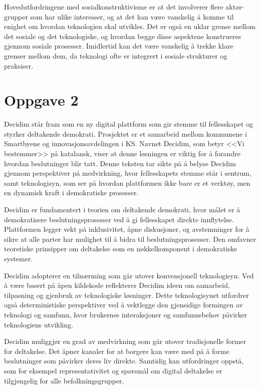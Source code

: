 \documentclass[a4paper, 12pt]{article}  %
\begin{document}
Hovedutfordringene med sosialkonstruktivisme er at det involverer flere aktør-grupper som har ulike interesser, og at det kan være vanskelig å komme til enighet om hvordan teknologien skal utvikles. 
Det er også en uklar grense mellom det sosiale og det teknologiske, og hvordan begge disse aspektene konstrueres gjennom sosiale prosesser.
Imidlertid kan det være vanskelig å trekke klare grenser mellom dem, da teknologi ofte er integrert i sosiale strukturer og praksiser.


\section*{Oppgave 2}

Decidim står fram som en ny digital plattform som gir stemme til fellesskapet og styrker deltakende demokrati.
Prosjektet er et samarbeid mellom kommunene i Smartbyene og innovasjonsavdelingen i KS. 
Navnet Decidim, som betyr <<Vi bestemmer>> på katalansk, viser at denne løsningen er viktig for å forandre hvordan beslutninger blir tatt.
Denne teksten tar sikte på å belyse Decidim gjennom perspektiver på medvirkning, hvor fellesskapets stemme står i sentrum, samt teknologisyn, som ser på hvordan plattformen ikke bare er et verktøy, men en dynamisk kraft i demokratiske prosesser.

Decidim er fundamentert i teorien om deltakende demokrati, hvor målet er å demokratisere beslutningsprosesser ved å gi fellesskapet direkte innflytelse.
Plattformen legger vekt på inklusivitet, åpne diskusjoner, og avstemninger for å sikre at alle parter har mulighet til å bidra til beslutningsprosesser.
Den omfavner teoretiske prinsipper om deltakelse som en nøkkelkomponent i demokratiske systemer.

Decidim adopterer en tilnærming som går utover konvensjonell teknologisyn. 
Ved å være basert på åpen kildekode reflekterer Decidim ideen om samarbeid, tilpasning og gjenbruk av teknologiske løsninger.
Dette teknologisynet utfordrer også deterministiske perspektiver ved å vektlegge den gjensidige formingen av teknologi og samfunn, hvor brukernes interaksjoner og samfunnsbehov påvirker teknologiens utvikling.

Decidim muliggjør en grad av medvirkning som går utover tradisjonelle former for deltakelse. Det åpner kanaler for at borgere kan være med på å forme beslutninger som påvirker deres liv direkte. Samtidig kan utfordringer oppstå, som for eksempel representativitet og spørsmål om digital deltakelse er tilgjengelig for alle befolkningsgrupper.
\end{document}
